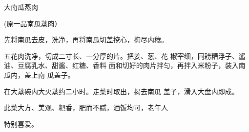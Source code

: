 \begin{recipe}{大南瓜蒸肉}

(原一品南瓜蒸肉）

\ingredients


\cooking

\step 	先将南瓜去皮，洗净，再将南瓜切盖挖心，掏尽内穰。

\step 	五花肉洗净，切成二寸长、一分厚的片。把姜、葱、花 椒宰细，同耢糟浮子、酱油、豆腐乳水、甜酱、红糖、香料 面和切好的肉片拌匀，再拌入米粉子，装入南瓜内，盖上南 瓜盖子。

\step 	在大蒸碗内大火蒸约二小时。走菜时取出，揭去南瓜 盖子，滑入大盘内即成。

\notes

此菜大方、美观、粑香，肥而不腻，酒饭均可，老年人

特别喜爱。

\end{recipe}

